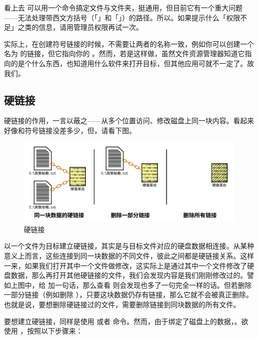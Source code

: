 {{{看上去  可以用一个命令搞定文件与文件夹，挺通用，但目前它有一个重大问题——无法处理带西文方括号（「\MissingVerb{[}」和「\MissingVerb{]}」）的路径。所以。如果提示什么「权限不足」之类的信息，请用管理员权限再试一次。

实际上，在创建符号链接的时候，不需要让两者的名称一致，例如你可以创建一个名为  的链接，但它指向你的 。然而，若是这样做，虽然文件资源管理器知道它指向的是个什么东西，也知道用什么软件来打开目标，但其他应用可就不一定了。故我们。

\subsection{硬链接}

硬链接的作用，一言以蔽之——从多个位置访问、修改磁盘上同一块内容。看起来好像和符号链接没差多少，但，请看下图。

\begin{figure}[htb!]
  \centering
  \includegraphics[width=.8\textwidth]{assets/advanced/Hard_Link.pdf}
  \caption{硬链接}
  \label{fig:Hard_Link}
\end{figure}

以一个文件为目标建立硬链接，其实是与目标文件对应的硬盘数据相连接。从某种意义上而言，这些连接到同一块数据的不同文件，彼此之间都是硬链接关系。这样一来，如果我们打开其中一个文件做修改，这实际上是通过其中一个文件修改了硬盘数据，那么再打开其他硬链接的文件，我们会发现内容是我们刚刚修改过的。譬如上图中，给  加一句话，那么查看  则会发现也多了一句完全一样的话。但若删除一部分链接（例如删除 ），只要这块数据仍存有链接，那么它就不会被真正删除。也就是说，要想删除硬链接过的文件，需要删除链接到同块数据的所有文件。

要想建立硬链接，同样是使用  或者  命令。然而，由于绑定了磁盘上的数据，。欲使用 ，按照以下步骤来：

}}}
